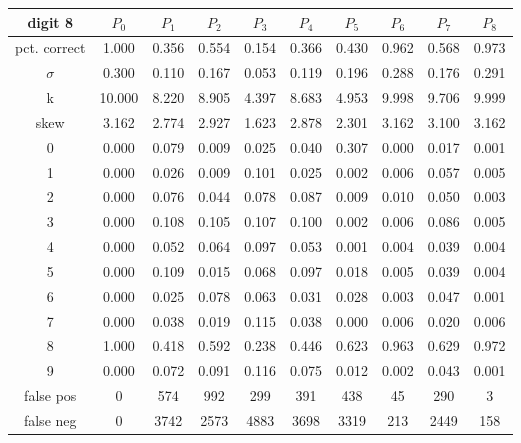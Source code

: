 \documentclass{report}
\begin{document}
\begin{tabular}{ | c ||  c | c | c | c | c | c | c | c | c |}
 digit 8 & $P_0$ & $P_1$ & $P_2$ & $P_3$ & $P_4$ & $P_5$ & $P_6$ & $P_7$ & $P_8$ \\
\hline \hline
pct. correct  & 1.000 & 0.356 & 0.554 & 0.154 & 0.366 & 0.430 & 0.962 & 0.568 & 0.973 \\
\hline
$\sigma$ & 0.300& 0.110& 0.167& 0.053& 0.119& 0.196& 0.288& 0.176& 0.291 \\
\hline
k & 10.000& 8.220& 8.905& 4.397& 8.683& 4.953& 9.998& 9.706& 9.999 \\
\hline
skew & 3.162& 2.774& 2.927& 1.623& 2.878& 2.301& 3.162& 3.100& 3.162 \\
\hline
0 & 0.000 & 0.079 & 0.009 & 0.025 & 0.040 & 0.307 & 0.000 & 0.017 & 0.001 \\
\hline
1 & 0.000 & 0.026 & 0.009 & 0.101 & 0.025 & 0.002 & 0.006 & 0.057 & 0.005 \\
\hline
2 & 0.000 & 0.076 & 0.044 & 0.078 & 0.087 & 0.009 & 0.010 & 0.050 & 0.003 \\
\hline
3 & 0.000 & 0.108 & 0.105 & 0.107 & 0.100 & 0.002 & 0.006 & 0.086 & 0.005 \\
\hline
4 & 0.000 & 0.052 & 0.064 & 0.097 & 0.053 & 0.001 & 0.004 & 0.039 & 0.004 \\
\hline
5 & 0.000 & 0.109 & 0.015 & 0.068 & 0.097 & 0.018 & 0.005 & 0.039 & 0.004 \\
\hline
6 & 0.000 & 0.025 & 0.078 & 0.063 & 0.031 & 0.028 & 0.003 & 0.047 & 0.001 \\
\hline
7 & 0.000 & 0.038 & 0.019 & 0.115 & 0.038 & 0.000 & 0.006 & 0.020 & 0.006 \\
\hline
8 & 1.000 & 0.418 & 0.592 & 0.238 & 0.446 & 0.623 & 0.963 & 0.629 & 0.972 \\
\hline
9 & 0.000 & 0.072 & 0.091 & 0.116 & 0.075 & 0.012 & 0.002 & 0.043 & 0.001 \\
\hline
false pos  & 0 & 574 & 992 & 299 & 391 & 438 & 45 & 290 & 3 \\
\hline
false neg  & 0 & 3742 & 2573 & 4883 & 3698 & 3319 & 213 & 2449 & 158 \\
\hline
\end{tabular}


\newpage
\end{document}
